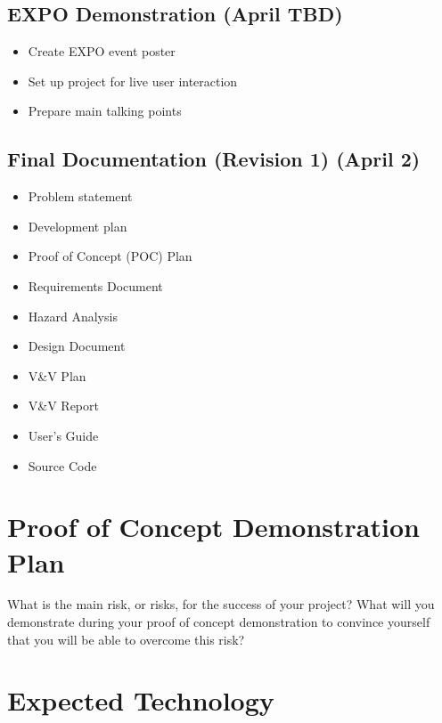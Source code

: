 \documentclass{article}
\begin{document}
	\subsection{EXPO Demonstration (April TBD)}
	\begin{itemize}
		\item Create EXPO event poster
		\item Set up project for live user interaction
		\item Prepare main talking points
	\end{itemize}

	\subsection{Final Documentation (Revision 1) (April 2)}
	\begin{itemize}
		\item Problem statement
		\item Development plan
		\item Proof of Concept (POC) Plan
		\item Requirements Document
		\item Hazard Analysis
		\item Design Document
		\item V\&V Plan
		\item V\&V Report
		\item User’s Guide
		\item Source Code
	\end{itemize}

\section{Proof of Concept Demonstration Plan}

What is the main risk, or risks, for the success of your project?  What will you
demonstrate during your proof of concept demonstration to convince yourself that
you will be able to overcome this risk?

\section{Expected Technology}

\end{document}
